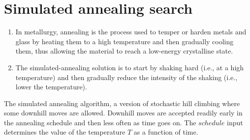 \section{Simulated annealing search \cite{ai/book/Artificial-Intelligence-A-Modern-Approach/Russell-Norvig}}
\label{AI: Algorithms/Simulated annealing search}


\begin{enumerate}
    \item In metallurgy, annealing is the process used to temper or harden metals and glass by heating them to a high temperature and then gradually cooling them, thus allowing the material to reach a low-energy crystalline state.
    \hfill \cite{ai/book/Artificial-Intelligence-A-Modern-Approach/Russell-Norvig}

    \item The simulated-annealing solution is to start by shaking hard (i.e., at a high temperature) and then gradually reduce the intensity of the shaking (i.e., lower the temperature).
    \hfill \cite{ai/book/Artificial-Intelligence-A-Modern-Approach/Russell-Norvig}
\end{enumerate}


\vspace{0.5cm}

\begin{algorithm}[H]
    \caption{
        The simulated annealing algorithm, a version of stochastic hill climbing where some downhill moves are allowed.
        Downhill moves are accepted readily early in the annealing schedule and then less often as time goes on.
        The $schedule$ input determines the value of the temperature $T$ as a function of time.
        \cite{ai/book/Artificial-Intelligence-A-Modern-Approach/Russell-Norvig}
    }


\end{algorithm}


